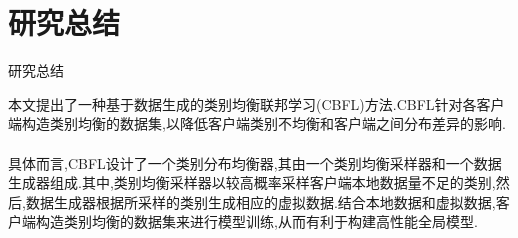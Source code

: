 \documentclass{sintefbeamer}
\theoremstyle{definition}
\begin{document}
\section{研究总结}

\begin{frame}{研究总结}

本文提出了一种基于数据生成的类别均衡联邦学习(CBFL)方法.CBFL针对各客户端构造类别均衡的数据集,以降低客户端类别不均衡和客户端之间分布差异的影响.
\\ \hspace*{\fill} \\
具体而言,CBFL设计了一个类别分布均衡器,其由一个类别均衡采样器和一个数据生成器组成.其中,类别均衡采样器以较高概率采样客户端本地数据量不足的类别,然后,数据生成器根据所采样的类别生成相应的虚拟数据.结合本地数据和虚拟数据,客户端构造类别均衡的数据集来进行模型训练,从而有利于构建高性能全局模型.
\end{frame}



\backmatter
\end{document}

